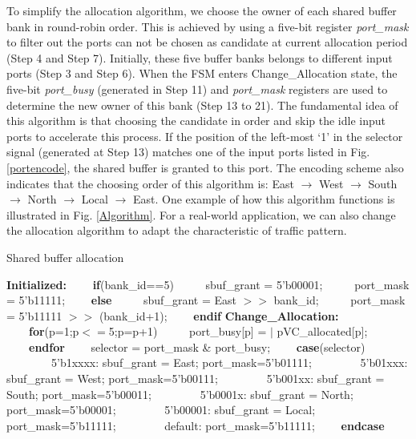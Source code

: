 \documentclass[10pt,conference]{IEEEtran}
\begin{document}
To simplify the allocation algorithm, we choose the owner of each shared buffer bank in round-robin order. This is achieved by using a five-bit register \emph{port\_mask} to filter out the ports can not be chosen as candidate at current allocation period (Step 4 and Step 7). Initially, these five buffer banks belongs to different input ports (Step 3 and Step 6). When the FSM enters Change\_Allocation state, the five-bit \emph{port\_busy} (generated in Step 11) and \emph{port\_mask} registers are used to determine the new owner of this bank (Step 13 to 21). The fundamental idea of this algorithm is that choosing the candidate in order and skip the idle input ports to accelerate this process. If the position of the left-most `1' in the selector signal (generated at Step 13) matches one of the input ports listed in Fig. \ref{portencode}, the shared buffer is granted to this port. The encoding scheme also indicates that the choosing order of this algorithm is: East $\to$ West $\to$ South $\to$ North $\to$ Local $\to$ East. One example of how this algorithm functions is illustrated in Fig. \ref{Algorithm}. For a real-world application, we can also change the allocation algorithm to adapt the characteristic of traffic pattern.
\begin{algorithm}
\caption{Shared buffer allocation}\label{alg:bufferalloc}
\begin{algorithmic}[1]
\STATE \textbf{Initialized:}
\STATE \ \ \ \ \textbf{if}(bank\_id==5)
\STATE \ \ \ \ \ sbuf\_grant = 5'b00001;
\STATE \ \ \ \ \ port\_mask = 5'b11111;
\STATE \ \ \ \ \textbf{else}
\STATE \ \ \ \ \ sbuf\_grant = East $>>$ bank\_id;
\STATE \ \ \ \ \ port\_mask = 5'b11111 $>>$ (bank\_id+1);
\STATE \ \ \ \ \textbf{endif}
\STATE \textbf{Change\_Allocation:}
\STATE \ \ \ \ \textbf{for}(p=1;p$<=$5;p=p+1)
\STATE \ \ \ \ \ port\_busy[p] = $|$ pVC\_allocated[p];
\STATE \ \ \ \ \textbf{endfor}
\STATE \ \ \ \ selector = port\_mask \& port\_busy;
\STATE \ \ \ \ \textbf{case}(selector)
\STATE \ \ \ \ \ \ \ \ 5'b1xxxx: sbuf\_grant = East; port\_mask=5'b01111;
\STATE \ \ \ \ \ \ \ \ 5'b01xxx: sbuf\_grant = West; port\_mask=5'b00111;
\STATE \ \ \ \ \ \ \ \ 5'b001xx: sbuf\_grant = South; port\_mask=5'b00011;
\STATE \ \ \ \ \ \ \ \ 5'b0001x: sbuf\_grant = North; port\_mask=5'b00001;
\STATE \ \ \ \ \ \ \ \ 5'b00001: sbuf\_grant = Local; port\_mask=5'b11111;
\STATE \ \ \ \ \ \ \ \ default: port\_mask=5'b11111;
\STATE \ \ \ \ \textbf{endcase}
\end{algorithmic}
\end{algorithm}
\end{document}
